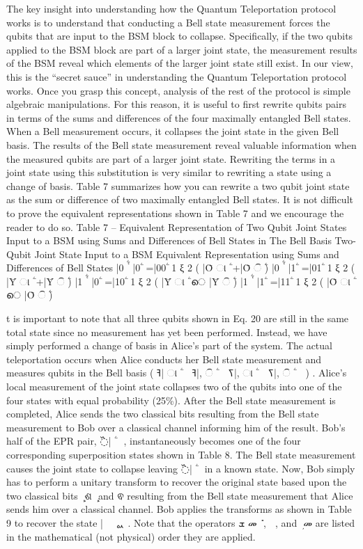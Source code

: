 The key insight into understanding how the Quantum Teleportation protocol works is to understand that conducting a Bell state measurement forces the qubits that are input to the BSM block to collapse. Specifically, if the two qubits applied to the BSM block are part of a larger joint state, the measurement results of the BSM reveal which elements of the larger joint state still exist. In our view, this is the “secret sauce” in understanding the Quantum Teleportation protocol works. Once you grasp this concept, analysis of the rest of the protocol is simple algebraic manipulations. For this reason, it is useful to first rewrite qubits pairs in terms of the sums and differences of the four maximally entangled Bell states. When a Bell measurement occurs, it collapses the joint state in the given Bell basis. The results of the Bell state measurement reveal valuable information when the measured qubits are part of a larger joint state. Rewriting the terms in a joint state using this substitution is very similar to rewriting a state using a change of basis. Table 7 summarizes how you can rewrite a two qubit joint state as the sum or difference of two maximally entangled Bell states. It is not difficult to prove the equivalent representations shown in Table 7 and we encourage the reader to do so. Table 7 – Equivalent Representation of Two Qubit Joint States Input to a BSM using Sums and Differences of Bell States in The Bell Basis Two-Qubit Joint State Input to a BSM Equivalent Representation using Sums and Differences of Bell States |0 ۧ ٔ |0 ۧ =|00 ۧ 1 ξ 2 ( |Ȱ ା ۧ +|Ȱ ି ۧ) |0 ۧ ٔ |1 ۧ =|01 ۧ 1 ξ 2 ( |Ȳ ା ۧ +|Ȳ ି ۧ) |1 ۧ ٔ |0 ۧ =|10 ۧ 1 ξ 2 ( |Ȳ ା ۧ െ |Ȳ ି ۧ) |1 ۧ ٔ |1 ۧ =|11 ۧ 1 ξ 2 ( |Ȱ ା ۧ െ |Ȱ ି ۧ)

t is important to note that all three qubits shown in Eq. 20 are still in the same total state since no measurement has yet been performed. Instead, we have simply performed a change of basis in Alice’s part of the system. The actual teleportation occurs when Alice conducts her Bell state measurement and measures qubits in the Bell basis ( ߔ| ା ۧ ஼஺ ߔ|, ି ۧ ஼஺ ߖ|, ା ۧ ஼஺ ߖ|, ି ۧ ஼஺ ) . Alice’s local measurement of the joint state collapses two of the qubits into one of the four states with equal probability (25\%). After the Bell state measurement is completed, Alice sends the two classical bits resulting from the Bell state measurement to Bob over a classical channel informing him of the result. Bob’s half of the EPR pair, ߰| ۧ ஻ , instantaneously becomes one of the four corresponding superposition states shown in Table 8. The Bell state measurement causes the joint state to collapse leaving ߰| ۧ ஻ in a known state. Now, Bob simply has to perform a unitary transform to recover the original state based upon the two classical bits ܾ ଶ ܾ and ଵ resulting from the Bell state measurement that Alice sends him over a classical channel. Bob applies the transforms as shown in Table 9 to recover the state |࣒ ۧ ࡯ ᇱ . Note that the operators ܫ መ ܺ , ෠ , and ܼ መ are listed in the mathematical (not physical) order they are applied.

